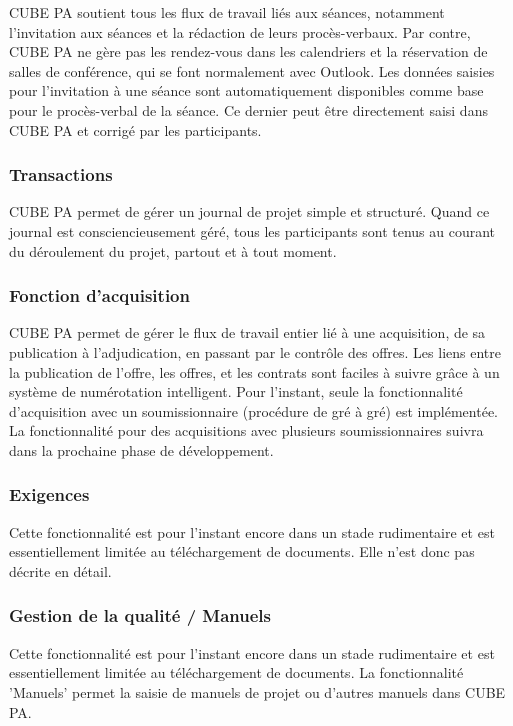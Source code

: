CUBE PA soutient tous les flux de travail liés aux séances, notamment l'invitation aux séances et la rédaction de leurs procès-verbaux. Par contre, CUBE PA ne gère pas les rendez-vous dans les calendriers et la réservation de salles de conférence, qui se font normalement avec Outlook. Les données saisies pour l'invitation à une séance sont automatiquement disponibles comme base pour le procès-verbal de la séance. Ce dernier peut être directement saisi dans CUBE PA et corrigé par les participants.

\subsubsection{Transactions} %

CUBE PA permet de gérer un journal de projet simple et structuré. Quand ce journal est consciencieusement géré, tous les participants sont tenus au courant du déroulement du projet, partout et à tout moment.

\subsubsection{Fonction d'acquisition} %

CUBE PA permet de gérer le flux de travail entier lié à une acquisition, de sa publication à l'adjudication, en passant par le contrôle des offres. Les liens entre la publication de l'offre, les offres, et les contrats sont faciles à suivre grâce à un système de numérotation intelligent. Pour l'instant, seule la fonctionnalité d'acquisition avec un soumissionnaire (procédure de gré à gré) est implémentée. La fonctionnalité pour des acquisitions avec plusieurs soumissionnaires suivra dans la prochaine phase de développement.

\subsubsection{Exigences} %

Cette fonctionnalité est pour l'instant encore dans un stade rudimentaire et est essentiellement limitée au téléchargement de documents. Elle n'est donc pas décrite en détail.

\subsubsection{Gestion de la qualité / Manuels} %

Cette fonctionnalité est pour l'instant encore dans un stade rudimentaire et est essentiellement limitée au téléchargement de documents. La fonctionnalité 'Manuels' permet la saisie de manuels de projet ou d'autres manuels dans CUBE PA.

